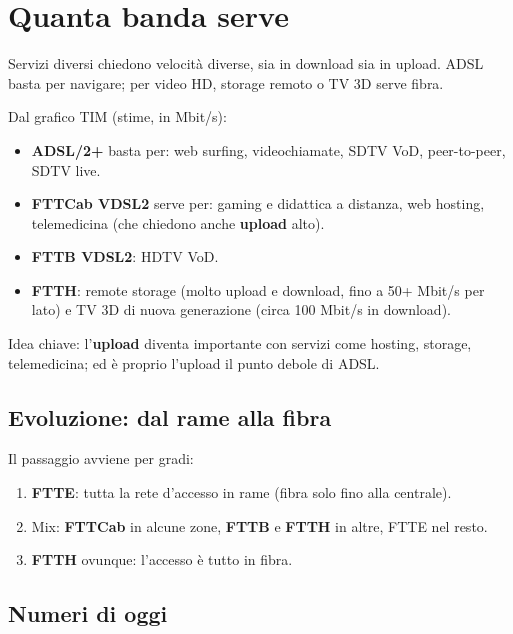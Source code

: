 \section{Quanta banda serve}

\begin{inbreve}

Servizi diversi chiedono velocità diverse, sia in download sia in upload. ADSL basta per navigare; per video HD, storage remoto o TV 3D serve fibra.

\end{inbreve}

Dal grafico TIM (stime, in Mbit/s):

\begin{itemize}
\tightlist
\item
  \textbf{ADSL/2+} basta per: web surfing, videochiamate, SDTV VoD, peer-to-peer, SDTV live.
\item
  \textbf{FTTCab VDSL2} serve per: gaming e didattica a distanza, web hosting, telemedicina (che chiedono anche \textbf{upload} alto).
\item
  \textbf{FTTB VDSL2}: HDTV VoD.
\item
  \textbf{FTTH}: remote storage (molto upload e download, fino a 50+ Mbit/s per lato) e TV 3D di nuova generazione (circa 100 Mbit/s in download).
\end{itemize}

Idea chiave: l'\textbf{upload} diventa importante con servizi come hosting, storage, telemedicina; ed è proprio l'upload il punto debole di ADSL.

\subsection{Evoluzione: dal rame alla fibra}

Il passaggio avviene per gradi:

\begin{enumerate}
\def\labelenumi{\arabic{enumi}.}
\tightlist
\item
  \textbf{FTTE}: tutta la rete d'accesso in rame (fibra solo fino alla centrale).
\item
  Mix: \textbf{FTTCab} in alcune zone, \textbf{FTTB} e \textbf{FTTH} in altre, FTTE nel resto.
\item
  \textbf{FTTH} ovunque: l'accesso è tutto in fibra.
\end{enumerate}

\subsection{Numeri di oggi}

